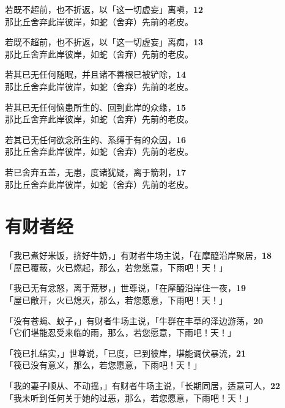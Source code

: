 若既不超前，也不折返，以「这一切虚妄」离嗔，\hfill{\grayfootnotesize \textbf{12}} \\
那比丘舍弃此岸彼岸，如蛇（舍弃）先前的老皮。

若既不超前，也不折返，以「这一切虚妄」离痴，\hfill{\grayfootnotesize \textbf{13}} \\
那比丘舍弃此岸彼岸，如蛇（舍弃）先前的老皮。

若其已无任何随眠，并且诸不善根已被铲除，\hfill{\grayfootnotesize \textbf{14}} \\
那比丘舍弃此岸彼岸，如蛇（舍弃）先前的老皮。


若其已无任何恼患所生的、回到此岸的众缘，\hfill{\grayfootnotesize \textbf{15}} \\
那比丘舍弃此岸彼岸，如蛇（舍弃）先前的老皮。


若其已无任何欲念所生的、系缚于有的众因，\hfill{\grayfootnotesize \textbf{16}} \\
那比丘舍弃此岸彼岸，如蛇（舍弃）先前的老皮。


若已舍弃五盖，无患，度诸犹疑，离于箭刺，\hfill{\grayfootnotesize \textbf{17}} \\
那比丘舍弃此岸彼岸，如蛇（舍弃）先前的老皮。


\section{有财者经}

「我已煮好米饭，挤好牛奶，」有财者牛场主说，「在摩醯沿岸聚居，\hfill{\grayfootnotesize \textbf{18}} \\
「屋已覆蔽，火已燃起，那么，若您愿意，下雨吧！天！」


「我已无有忿怒，离于荒秽，」世尊说，「在摩醯沿岸住一夜，\hfill{\grayfootnotesize \textbf{19}} \\
「屋已敞开，火已熄灭，那么，若您愿意，下雨吧！天！」


「没有苍蝇、蚊子，」有财者牛场主说，「牛群在丰草的泽边游荡，\hfill{\grayfootnotesize \textbf{20}} \\
「它们堪能忍受来临的雨，那么，若您愿意，下雨吧！天！」


「筏已扎结实，」世尊说，「已度，已到彼岸，堪能调伏暴流，\hfill{\grayfootnotesize \textbf{21}} \\
「筏已没有意义，那么，若您愿意，下雨吧！天！」


「我的妻子顺从、不动摇，」有财者牛场主说，「长期同居，适意可人，\hfill{\grayfootnotesize \textbf{22}} \\
「我未听到任何关于她的过恶，那么，若您愿意，下雨吧！天！」


